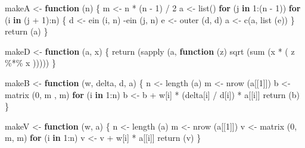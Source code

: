 \documentclass[
  12pt,
  letterpaper,
  DIV=11,
  numbers=noendperiod]{scrreprt}
\newenvironment{Shaded}{\begin{snugshade}}{\end{snugshade}}
\newcommand{\ControlFlowTok}[1]{\textcolor[rgb]{0.00,0.23,0.31}{\textbf{#1}}}
\newcommand{\DecValTok}[1]{\textcolor[rgb]{0.68,0.00,0.00}{#1}}
\newcommand{\FunctionTok}[1]{\textcolor[rgb]{0.28,0.35,0.67}{#1}}
\newcommand{\NormalTok}[1]{\textcolor[rgb]{0.00,0.23,0.31}{#1}}
\newcommand{\OtherTok}[1]{\textcolor[rgb]{0.00,0.23,0.31}{#1}}
\newcommand{\SpecialCharTok}[1]{\textcolor[rgb]{0.37,0.37,0.37}{#1}}
\theoremstyle{remark}
\begin{document}
\begin{Shaded}
\begin{Highlighting}[]
\NormalTok{makeA }\OtherTok{\textless{}{-}} \ControlFlowTok{function}\NormalTok{ (n) \{}
\NormalTok{  m }\OtherTok{\textless{}{-}}\NormalTok{ n }\SpecialCharTok{*}\NormalTok{ (n }\SpecialCharTok{{-}} \DecValTok{1}\NormalTok{) }\SpecialCharTok{/} \DecValTok{2}
\NormalTok{  a }\OtherTok{\textless{}{-}} \FunctionTok{list}\NormalTok{()}
  \ControlFlowTok{for}\NormalTok{ (j }\ControlFlowTok{in} \DecValTok{1}\SpecialCharTok{:}\NormalTok{(n }\SpecialCharTok{{-}} \DecValTok{1}\NormalTok{))}
    \ControlFlowTok{for}\NormalTok{ (i }\ControlFlowTok{in}\NormalTok{ (j }\SpecialCharTok{+} \DecValTok{1}\NormalTok{)}\SpecialCharTok{:}\NormalTok{n) \{}
\NormalTok{      d }\OtherTok{\textless{}{-}} \FunctionTok{ein}\NormalTok{ (i, n) }\SpecialCharTok{{-}}\FunctionTok{ein}\NormalTok{ (j, n)}
\NormalTok{      e }\OtherTok{\textless{}{-}} \FunctionTok{outer}\NormalTok{ (d, d)}
\NormalTok{      a }\OtherTok{\textless{}{-}} \FunctionTok{c}\NormalTok{(a, }\FunctionTok{list}\NormalTok{ (e))}
\NormalTok{    \}}
  \FunctionTok{return}\NormalTok{ (a)}
\NormalTok{\}}

\NormalTok{makeD }\OtherTok{\textless{}{-}} \ControlFlowTok{function}\NormalTok{ (a, x) \{}
  \FunctionTok{return}\NormalTok{ (}\FunctionTok{sapply}\NormalTok{ (a, }\ControlFlowTok{function}\NormalTok{ (z)}
    \FunctionTok{sqrt}\NormalTok{ (}\FunctionTok{sum}\NormalTok{ (x }\SpecialCharTok{*}\NormalTok{ (}
\NormalTok{      z }\SpecialCharTok{\%*\%}\NormalTok{ x}
\NormalTok{    )))))}
\NormalTok{\}}

\NormalTok{makeB }\OtherTok{\textless{}{-}} \ControlFlowTok{function}\NormalTok{ (w, delta, d, a) \{}
\NormalTok{  n }\OtherTok{\textless{}{-}} \FunctionTok{length}\NormalTok{ (a)}
\NormalTok{  m }\OtherTok{\textless{}{-}} \FunctionTok{nrow}\NormalTok{ (a[[}\DecValTok{1}\NormalTok{]])}
\NormalTok{  b }\OtherTok{\textless{}{-}} \FunctionTok{matrix}\NormalTok{ (}\DecValTok{0}\NormalTok{, m , m)}
  \ControlFlowTok{for}\NormalTok{ (i }\ControlFlowTok{in} \DecValTok{1}\SpecialCharTok{:}\NormalTok{n)}
\NormalTok{    b }\OtherTok{\textless{}{-}}\NormalTok{ b }\SpecialCharTok{+}\NormalTok{ w[i] }\SpecialCharTok{*}\NormalTok{ (delta[i] }\SpecialCharTok{/}\NormalTok{ d[i]) }\SpecialCharTok{*}\NormalTok{ a[[i]]}
  \FunctionTok{return}\NormalTok{ (b)}
\NormalTok{\}}

\NormalTok{makeV }\OtherTok{\textless{}{-}} \ControlFlowTok{function}\NormalTok{ (w, a) \{}
\NormalTok{  n }\OtherTok{\textless{}{-}} \FunctionTok{length}\NormalTok{ (a)}
\NormalTok{  m }\OtherTok{\textless{}{-}} \FunctionTok{nrow}\NormalTok{ (a[[}\DecValTok{1}\NormalTok{]])}
\NormalTok{  v }\OtherTok{\textless{}{-}} \FunctionTok{matrix}\NormalTok{ (}\DecValTok{0}\NormalTok{, m, m)}
  \ControlFlowTok{for}\NormalTok{ (i }\ControlFlowTok{in} \DecValTok{1}\SpecialCharTok{:}\NormalTok{n)}
\NormalTok{    v }\OtherTok{\textless{}{-}}\NormalTok{ v }\SpecialCharTok{+}\NormalTok{ w[i] }\SpecialCharTok{*}\NormalTok{ a[[i]]}
  \FunctionTok{return}\NormalTok{ (v)}
\NormalTok{\}}


\end{Highlighting}
\end{Shaded}
\end{document}
